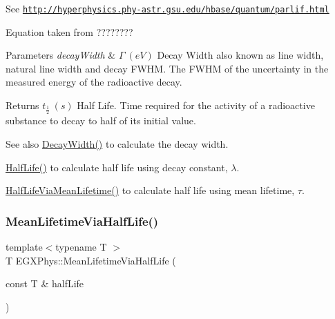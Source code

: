 See \href{http://hyperphysics.phy-astr.gsu.edu/hbase/quantum/parlif.html}{\tt http\+://hyperphysics.\+phy-\/astr.\+gsu.\+edu/hbase/quantum/parlif.\+html}

Equation taken from ????????


\begin{DoxyParams}{Parameters}
{\em decay\+Width} & $\Gamma\ (eV)$ Decay Width also known as line width, natural line width and decay F\+W\+HM. The F\+W\+HM of the uncertainty in the measured energy of the radioactive decay. \\
\hline
\end{DoxyParams}
\begin{DoxyReturn}{Returns}
$t_{\frac{1}{2}}\ (s)$ Half Life. Time required for the activity of a radioactive substance to decay to half of its initial value. 
\end{DoxyReturn}
\begin{DoxySeeAlso}{See also}
\mbox{\hyperlink{group___e_g_x_phys-_decay_width_gae232ec8bb39710131be898c057a25620}{Decay\+Width()}} to calculate the decay width. 

\mbox{\hyperlink{group___e_g_x_phys-_half_life_ga21d268f154fb91c1c556bbfa7fe83ac1}{Half\+Life()}} to calculate half life using decay constant, $\lambda$. 

\mbox{\hyperlink{group___e_g_x_phys-_half_life_gacddef16b62e98b214ec8dd8af7da7dce}{Half\+Life\+Via\+Mean\+Lifetime()}} to calculate half life using mean lifetime, $\tau$. 
\end{DoxySeeAlso}
\mbox{\label{group___e_g_x_phys-_mean_lifetime_ga2586e148263e1f6c8ff89f269a0930ea}} 
\subsubsection{\texorpdfstring{Mean\+Lifetime\+Via\+Half\+Life()}{MeanLifetimeViaHalfLife()}}
{\footnotesize\ttfamily template$<$typename T $>$ \\
T E\+G\+X\+Phys\+::\+Mean\+Lifetime\+Via\+Half\+Life (\begin{DoxyParamCaption}\item[{const T \&}]{half\+Life }\end{DoxyParamCaption})}



